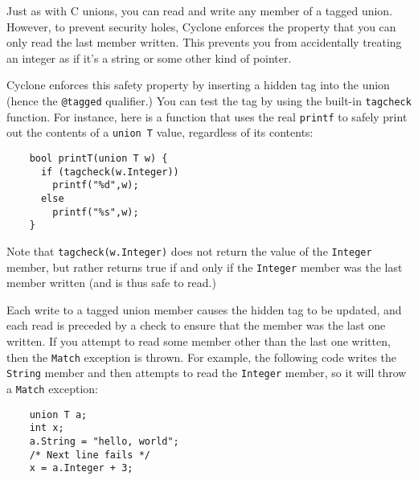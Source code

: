 Just as with C unions, you can read and write any member of a tagged 
union.  However, to prevent security holes, Cyclone enforces the
property that you can only read the last member written.  This
prevents you from accidentally treating an integer as if it's
a string or some other kind of pointer.  

Cyclone enforces this safety property by inserting a hidden tag
into the union (hence the \texttt{@tagged} qualifier.)  
You can test the
tag by using the built-in \texttt{tagcheck} function.  For
instance, here is a function that uses the real \texttt{printf}
to safely print out the contents of a \texttt{union T} value,
regardless of its contents:
\begin{verbatim}
    bool printT(union T w) {
      if (tagcheck(w.Integer))
        printf("%d",w);
      else 
        printf("%s",w);
    }
\end{verbatim}
Note that \texttt{tagcheck(w.Integer)} does not return the
value of the \texttt{Integer} member, but rather returns true
if and only if the \texttt{Integer} member was the last member
written (and is thus safe to read.)  

Each write to a tagged union member causes the hidden tag to
be updated, and each read is preceded by a 
check to ensure that the member was the last one written.
If you attempt to read some member other than the last one
written, then the \texttt{Match}
exception is thrown.  For example, the following code writes
the \texttt{String} member and then attempts to read the
\texttt{Integer} member, so it will throw a \texttt{Match}
exception:
\begin{verbatim}
    union T a;
    int x;
    a.String = "hello, world";
    /* Next line fails */
    x = a.Integer + 3;
\end{verbatim}


